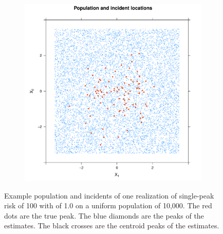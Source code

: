 \begin{figure}[htbp]
\begin{subfigure}[t]{0.32\textwidth}
        \label{fig:cases_scatter:unif_100_1.0_1h:poppts}
    \end{subfigure}%
    \begin{subfigure}[t]{0.32\textwidth}
        \includegraphics[width=\textwidth]{output/population_and_incidents_scatter}
        \label{fig:cases_scatter:unif_100_1.0_1h:incidentspts}
    \end{subfigure}%
    \caption[Example population and incidents: single-peak risk on uniform population]
        {Example population and incidents of one realization of single-peak risk of  100 with  of 1.0 on a uniform population of 10,000. The red dots are the true peak. The blue diamonds are the peaks of the estimates. The black crosses are the centroid peaks of the estimates.}
    \label{fig:cases_scatter:unif_100_1.0_1h}    
\end{figure}

